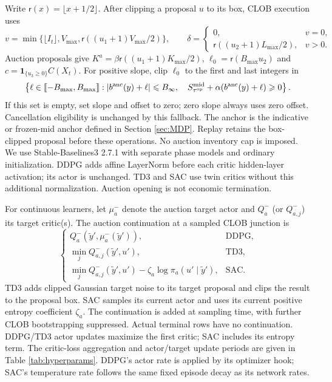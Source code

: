 \documentclass[11pt]{article}
\begin{document}
\label{app:projection}
Write $\mathsf r(x)=\lfloor x+1/2\rfloor$. After clipping a proposal $u$ to its box, CLOB execution uses
\[
v=\min\{\lfloor I_t\rfloor,V_{\max},\mathsf r((u_1+1)V_{\max}/2)\},\qquad
\delta=\begin{cases}0,&v=0,\\\mathsf r((u_2+1)L_{\max}/2),&v>0.\end{cases}
\]
Auction proposals give $K^a=\beta\mathsf r((u_1+1)K_{\max}/2)$, $\ell_0=\mathsf r(B_{\max}u_2)$ and $c=\mathbf1_{\{u_3\geqslant0\}}C(X_t)$. For positive slope, clip $\ell_0$ to the first and last integers in
\[
\left\{\ell\in\llbracket-B_{\max},B_{\max}\rrbracket:
|b^{\mathrm{anc}}(y)+\ell|\leqslant B_\infty,\quad
S_{\tau^{\mathrm{op}}}^{\mathrm{mid}}+\alpha(b^{\mathrm{anc}}(y)+\ell)\geqslant0\right\}.
\]
If this set is empty, set slope and offset to zero; zero slope always uses zero offset. Cancellation eligibility is unchanged by this fallback. The anchor is the indicative or frozen-mid anchor defined in Section \ref{sec:MDP}. Replay retains the box-clipped proposal before these operations. No auction inventory cap is imposed.
We use Stable-Baselines3 2.7.1 with separate phase models and ordinary initialization. DDPG adds affine LayerNorm before each critic hidden-layer activation; its actor is unchanged. TD3 and SAC use twin critics without this additional normalization. Auction opening is not economic termination.\vspace{0.5em}

For continuous learners, let $\mu_a^-$ denote the auction target actor and $Q_a^-$ (or $Q_{a,j}^-$) its target critic(s). The auction continuation at a sampled CLOB junction is
\[
\begin{cases}
Q_a^-(\tilde y',\mu_a^-(\tilde y')),&\text{DDPG},\\
\min_jQ_{a,j}^-(\tilde y',u'),&\text{TD3},\\
\min_jQ_{a,j}^-(\tilde y',u')-\zeta_a\log\pi_a(u'\mid\tilde y'),&\text{SAC}.
\end{cases}
\]
TD3 adds clipped Gaussian target noise to its target proposal and clips the result to the proposal box. SAC samples its current actor and uses its current positive entropy coefficient $\zeta_a$. The continuation is added at sampling time, with further CLOB bootstrapping suppressed. Actual terminal rows have no continuation. DDPG/TD3 actor updates maximize the first critic; SAC includes its entropy term. The critic-loss aggregation and actor/target update periods are given in Table \ref{tab:hyperparams}. DDPG's actor rate is applied by its optimizer hook; SAC's temperature rate follows the same fixed episode decay as its network rates.\vspace{0.5em}
\end{document}
